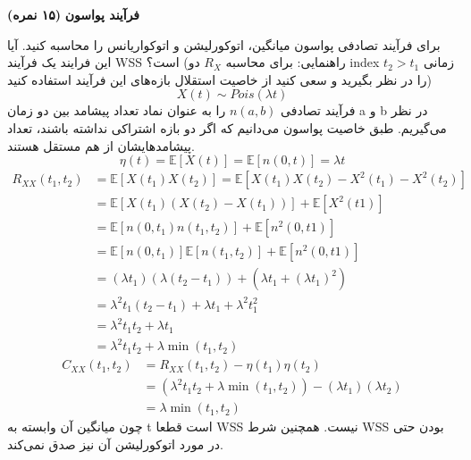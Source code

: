 \Large \textbf{فرآیند پواسون}
\large \textbf{(۱۵ نمره)}

\normalsize \vspace{0.5cm}
برای فرآیند تصادفی پواسون میانگین، اتوکورلیشن و اتوکواریانس را محاسبه کنید. آیا این فرایند یک فرآیند WSS است؟
(راهنمایی: برای محاسبه $ R_X $ دو index زمانی
$ t_2>t_1 $
 را در نظر بگیرید و سعی کنید از خاصیت استقلال بازه‌های این فرآیند استفاده کنید)
$$
 X(t) \sim Pois(\lambda t) 
$$
فرآیند تصادفی
$n(a, b)$
را به عنوان نماد تعداد پیشامد بین دو زمان a و b در نظر می‌گیریم. طبق خاصیت پواسون می‌دانیم که اگر دو بازه اشتراکی نداشته باشند، تعداد پیشامد‌هایشان از هم مستقل هستند.
$$
	\eta(t) = \mathbb{E}[X(t)] = \mathbb{E}[n(0,t)] = \lambda t
$$
\begin{align*}
	R_{XX}(t_1, t_2)&= \mathbb{E} [X(t_1)X(t_2)] = \mathbb{E} [X(t_1)X(t_2) - X^2(t_1) - X^2(t_2)]\\
	&=\mathbb{E}[X(t_1)(X(t_2) - X(t_1))] + \mathbb{E}[X^2(t1)]\\
	&=\mathbb{E}[n(0, t_1)n(t_1, t_2)] + \mathbb{E}[n^2(0, t1)]\\
	&=\mathbb{E}[n(0, t_1)]\mathbb{E}[n(t_1, t_2)] + \mathbb{E}[n^2(0, t1)]\\
	&=(\lambda t_1)(\lambda (t_2 - t_1)) + (\lambda t_1 + (\lambda t_1)^2)\\
	&=\lambda^2 t_1 (t_2 - t_1) + \lambda t_1 + \lambda ^2 t_1^2\\
	&=\lambda^2 t_1 t_2 + \lambda t_1\\
	&=\lambda^2 t_1 t_2 + \lambda \min(t_1, t_2)
\end{align*}
\begin{align*}
	C_{XX}(t_1, t_2) &= R_{XX}(t_1, t_2) - \eta(t_1)\eta(t_2)\\
	&= (\lambda^2 t_1 t_2 + \lambda \min(t_1, t_2)) - (\lambda t_1)(\lambda t_2)\\
	& = \lambda \min(t_1, t_2)
\end{align*}
چون میانگین آن وابسته به t است قطعا WSS نیست. همچنین شرط WSS بودن حتی در مورد اتوکورلیشن آن نیز صدق نمی‌کند.